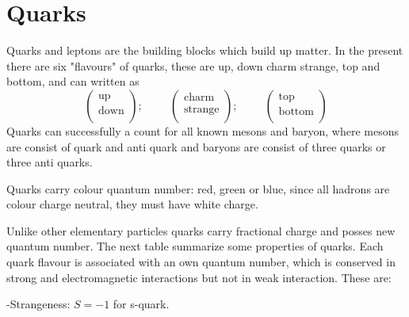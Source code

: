 \section{Quarks}
Quarks and leptons are the building blocks which build up matter. In the present
there are six "flavours" of quarks, these are up, down charm strange, top and bottom, and can written as
\begin{equation*}
  \left( \begin{array}{c}          
           \text{up}\\
           \text{down}\\
         \end{array}
  \right);  \hspace{1cm}    
  \left (\begin{array}{c}
           \text{charm}\\
           \text{strange}\\
         \end{array}
  \right)  ;  \hspace{1cm} 
  \left( \begin{array}{c}
           \text{top}\\
           \text{bottom}\\
         \end{array}
  \right)
\end{equation*}  
Quarks can successfully a count
for all known mesons and baryon, where mesons are consist
of quark and anti quark and baryons are consist of three quarks or three anti quarks.

Quarks carry colour quantum number: red, green or blue, since all hadrons are colour charge neutral, they must have white charge.

Unlike other elementary particles quarks carry fractional charge and posses new quantum number.
The next table summarize
some properties of quarks.
Each quark flavour is associated with an own quantum number, which is conserved
in strong and electromagnetic interactions but not in weak interaction.
These are: 

\noindent -Strangeness: $S=-1$ for s-quark. 

